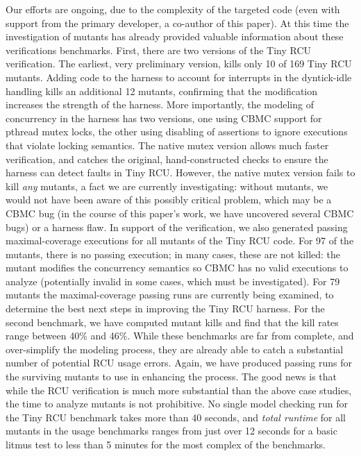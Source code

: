 \documentclass[conference]{IEEEtran}
\begin{document}
Our efforts are ongoing, due to the complexity of the targeted code
(even with support from the primary developer, a co-author of this
paper).  At this time the
investigation of mutants has already provided valuable information
about these verifications benchmarks.  First, there are two versions
of the Tiny RCU verification.  The earliest, very preliminary version,
kills only 10 of 169 Tiny RCU mutants.  Adding code to the harness to
account for interrupts in the dyntick-idle handling kills an
additional 12 mutants, confirming that the modification increases the
strength of the harness.  More importantly, the modeling of
concurrency in the harness has two versions, one using CBMC support
for pthread mutex locks, the other using disabling of assertions to
ignore executions that violate locking semantics.  The native mutex
version allows much faster verification, and catches the original,
hand-constructed checks to ensure the harness can detect faults in
Tiny RCU.  However, the native mutex version fails to kill \emph{any}
mutants, a fact we are currently investigating:  without mutants, we
would not have been aware of this possibly critical problem, which may
be a CBMC bug (in the course of this paper's work, we have uncovered
several CBMC bugs) or a harness flaw.  In support of the
verification, we also generated passing maximal-coverage executions for all
mutants of the Tiny RCU code.  For 97 of the mutants, there is no
passing execution; in many cases, these are not killed: the mutant
modifies the concurrency semantics so CBMC has no valid executions to
analyze (potentially invalid in some cases, which must be
investigated).  For 79 mutants the maximal-coverage passing runs are
currently being examined, to determine the best next steps in
improving the Tiny RCU harness.
For the second benchmark, we have computed mutant kills and find that
the kill rates range between 40\% and 46\%.  While these benchmarks
are far from complete, and over-simplify the modeling process, they
are already able to catch a substantial number of potential RCU usage
errors.  Again, we have produced passing runs for the surviving
mutants to use in enhancing the process.  The good news is that while
the RCU verification is much more substantial than the above case
studies, the time to analyze mutants is not prohibitive.  No single
model checking run for the Tiny RCU benchmark takes more than 40
seconds, and \emph{total runtime} for all mutants in the usage
benchmarks ranges from just over 12 seconds for a basic litmus test to
less than 5 minutes for the most complex of the benchmarks.
\end{document}
